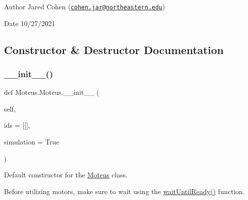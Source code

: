 \begin{DoxyAuthor}{Author}
Jared Cohen (\href{mailto:cohen.jar@northeastern.edu}{\tt cohen.\+jar@northeastern.\+edu}) 
\end{DoxyAuthor}
\begin{DoxyDate}{Date}
10/27/2021 
\end{DoxyDate}


\subsection{Constructor \& Destructor Documentation}
\mbox{\label{classMoteus_1_1Moteus_a9ef12c6e83e497055dd6ee037808dc30}} 
\subsubsection{\texorpdfstring{\+\_\+\+\_\+init\+\_\+\+\_\+()}{\_\_init\_\_()}}
{\footnotesize\ttfamily def Moteus.\+Moteus.\+\_\+\+\_\+init\+\_\+\+\_\+ (\begin{DoxyParamCaption}\item[{}]{self,  }\item[{}]{ids = {\ttfamily \mbox{[}\mbox{[}\mbox{]}},  }\item[{}]{simulation = {\ttfamily True} }\end{DoxyParamCaption})}



Default constructor for the \hyperlink{classMoteus_1_1Moteus}{Moteus} class. 

Before utilizing motors, make sure to wait using the \hyperlink{classMoteus_1_1Moteus_a363a7881500b2ca7efccc6dfd64dca42}{wait\+Until\+Ready()} function.


